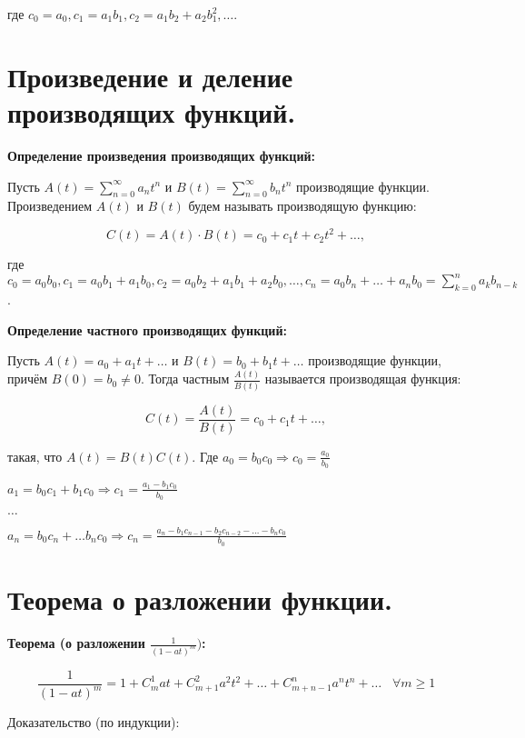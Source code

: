    где $c_0 = a_0, c_1 = a_1 b_1, c_2 = a_1 b_2 + a_2 b_1^2, \dots$.

\section{Произведение и деление производящих функций.}    

\textbf{Определение произведения производящих функций:}
    \smallskip

    Пусть $A(t) = \sum\limits^{\infty}_{n = 0} a_n t^n$ и $B(t) = \sum\limits^{\infty}_{n = 0}
    b_n t^n$ производящие функции. Произведением $A(t)$ и $B(t)$ будем называть
    производящую функцию:

    \[
        C(t) = A(t) \cdot B(t) = c_0 + c_1 t + c_2 t^2 + \dots,  
    \]

    где $c_0 = a_0 b_0, c_1 = a_0 b_1 + a_1 b_0, c_2 = a_0 b_2 + a_1 b_1 + a_2 b_0,
    \dots, c_n = a_0 b_n + \dots + a_n b_0 = \sum\limits^{n}_{k = 0} a_k b_{n - k}$.
    \bigskip

\textbf{Определение частного производящих функций:}
    \smallskip
    
    Пусть $A(t) = a_0 + a_1 t + \dots$ и $B(t) = b_0 + b_1 t + \dots$ производящие
    функции, причём $B(0) = b_0 \neq 0$. Тогда частным $\frac{A(t)}{B(t)}$
    называется производящая функция:

    \[
        C(t) = \frac{A(t)}{B(t)} = c_0 + c_1 t + \dots,  
    \]

    такая, что $A(t) = B(t) C(t)$. Где $a_0 = b_0 c_0 \Rightarrow c_0 = \frac{a_0}{b_0}$

    $a_1 = b_0 c_1 + b_1 c_0 \Rightarrow c_1 = \frac{a_1 - b_1 c_0}{b_0}$

    $\dots$

    $a_n = b_0 c_n + \dots b_n c_0 \Rightarrow c_n = \frac{a_n - b_1 c_{n - 1} - b_2
    c_{n - 2} - \dots - b_n c_0}{b_0}$

\section{Теорема о разложении функции.}

\textbf{Теорема (о разложении $\frac{1}{(1 - at)^m})$:}
    \smallskip

    \[
        \frac{1}{(1 - at)^m} = 1 + C^1_m a t + C^2_{m + 1} a^2 t^2 + \dots +
        C^n_{m + n - 1} a^n t^n + \dots \;\;\; \forall m \geq 1  
    \]
    \bigskip

    Доказательство (по индукции):
    \bigskip


